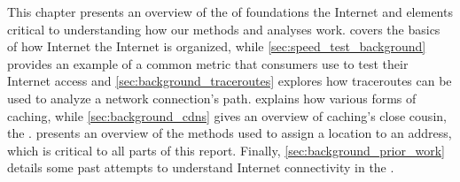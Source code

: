 This chapter presents an overview of the of foundations the Internet and elements critical to understanding how our methods and analyses work.  covers the basics of how Internet the Internet is organized, while \cref{sec:speed_test_background} provides an example of a common metric that consumers use to test their Internet access and \cref{sec:background_traceroutes} explores how traceroutes can be used to analyze a network connection's path.  explains how various forms of caching, while \cref{sec:background_cdns} gives an overview of caching's close cousin, the \cdn.  presents an overview of the methods used to assign a location to an \ip address, which is critical to all parts of this report. Finally, \cref{sec:background_prior_work} details some past attempts to understand Internet connectivity in the \us.

